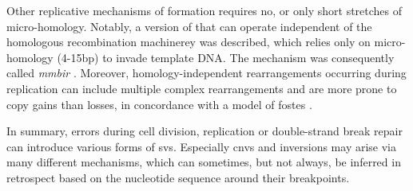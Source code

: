 Other replicative mechanisms of \sv formation requires no, or only short
stretches of micro-homology. Notably, a version of \bir that can operate
independent of the homologous recombination machinerey was described, which
relies only on micro-homology (4-15bp) to invade template DNA. The mechanism
was consequently called \emph{\acf{mmbir}} \citep{Hastings2009a}.
Moreover, homology-independent rearrangements occurring during replication can
include multiple complex rearrangements and are more prone to copy gains than
losses, in concordance with a model of \acf{fostes} \citep{Zhang2009a,Hastings2009}.

In summary, errors during cell division, replication or double-strand break repair
can introduce various forms of \aclp{sv}. Especially \acp{cnv} and inversions may
arise via many different mechanisms, which can sometimes, but not always, be
inferred in retrospect based on the nucleotide sequence around their breakpoints.
